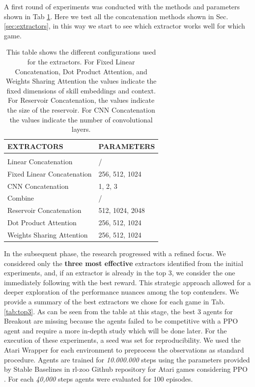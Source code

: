 A first round of experiments was conducted with the methods and parameters shown in Tab \ref{tab:firstround}.
Here we test all the concatenation methods shown in Sec. \ref{sec:extractors}, in this way we start to see which extractor works well for which game.
\begin{table}[htbp]
    \begin{center}
        \begin{tabular}{ll}
            \multicolumn{1}{l}{EXTRACTORS}  &\multicolumn{1}{l}{\bf PARAMETERS}
            \\ \hline \\
            Linear Concatenation              &  / \\
            Fixed Linear Concatenation        & 256, 512, 1024 \\
            CNN Concatenation                 & 1, 2, 3 \\
            Combine                           & / \\
            Reservoir Concatenation           & 512, 1024, 2048 \\
            Dot Product Attention             & 256, 512, 1024 \\
            Weights Sharing Attention         & 256, 512, 1024 \\

        \end{tabular}
    \end{center}
    \caption{This table shows the different configurations used for the extractors. For Fixed Linear Concatenation, Dot Product Attention, and Weights Sharing Attention the values indicate the fixed dimensions of skill embeddings and context. For Reservoir Concatenation, the values indicate the size of the reservoir. For CNN Concatenation the values indicate the number of convolutional layers.}
    \label{tab:firstround}
\end{table}

In the subsequent phase, the research progressed with a refined focus. We considered only the \textbf{three most effective} extractors identified from the initial experiments, and, if an extractor is already in the top 3, we consider the one immediately following with the best reward.
This strategic approach allowed for a deeper exploration of the performance nuances among the top contenders.
We provide a summary of the best extractors we chose for each game in Tab. \ref{tab:top3}.
As can be seen from the table at this stage, the best 3 agents for Breakout are missing because the agents failed to be competitive with a PPO agent and require a more in-depth study which will be done later.
For the execution of these experiments, a seed was set for reproducibility. We used the Atari Wrapper for each environment to preprocess the observations as standard procedure. Agents are trained for \textit{10.000.000} steps using the parameters provided by Stable Baselines in rl-zoo Github repository for Atari games considering PPO \cite{rl-zoo3}.
For each \textit{40,000} steps agents were evaluated for 100 episodes.

